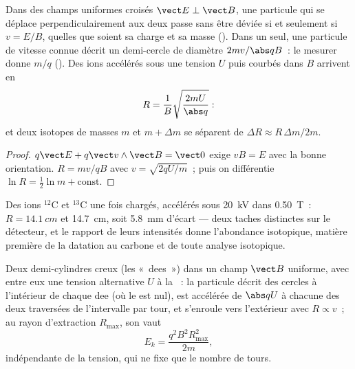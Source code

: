 \begin{proposition}\label{prop:b1:charged-particles:spectrometer}
Dans des champs uniformes croisés $\vect E \perp \vect B$, une particule
qui se déplace perpendiculairement aux deux passe sans être déviée si et
seulement si $v = E/B$, quelles que soient sa charge et sa masse
(\emph{}). Dans un  seul, une
particule de vitesse connue décrit un demi-cercle de diamètre
$2mv/\abs qB$~: le mesurer donne $m/q$ (\emph{}).
Des ions accélérés sous une tension $U$ puis courbés dans $B$ arrivent en
\[
R = \frac{1}{B}\sqrt{\frac{2mU}{\abs q}} :
\]
et deux isotopes de masses $m$ et $m + \Delta m$ se séparent de $\Delta R \approx
R\,\Delta m/2m$.
\end{proposition}

\begin{proof}
$q\vect E + q\vect v\wedge\vect B = \vect 0$ exige $vB = E$ avec la bonne
orientation. $R = mv/qB$ avec $v = \sqrt{2qU/m}$~; puis on différentie
$\ln R = \tfrac12\ln m + \text{const}$.
\end{proof}

\begin{example}\label{ex:b1:charged-particles:isotopes}
Des ions $^{12}$C et $^{13}$C une fois chargés, accélérés sous \qty{20}{kV}
dans \qty{0.50}{T}~: $R = \qty{14.1}{cm}$ et \qty{14.7}{cm}, soit
\qty{5.8}{mm} d'écart --- deux taches distinctes sur le détecteur, et le
rapport de leurs intensités donne l'abondance isotopique, matière
première de la datation au carbone et de toute analyse isotopique.
\end{example}

\begin{proposition}[Cyclotron]\label{prop:b1:charged-particles:cyclotron}
Deux demi-cylindres creux (les «~dees~») dans un champ $\vect B$
uniforme, avec entre eux une tension alternative $U$ à la ~: la particule décrit des cercles à l'intérieur de chaque dee
(où le  est nul), est accélérée de $\abs qU$ à chacune
des deux traversées de l'intervalle par tour, et s'enroule vers
l'extérieur avec $R \propto v$~; au rayon d'extraction $R_{\max}$, son
 vaut
\[
E_k = \frac{q^2B^2R_{\max}^2}{2m},
\]
indépendante de la tension, qui ne fixe que le nombre de tours.
\end{proposition}

